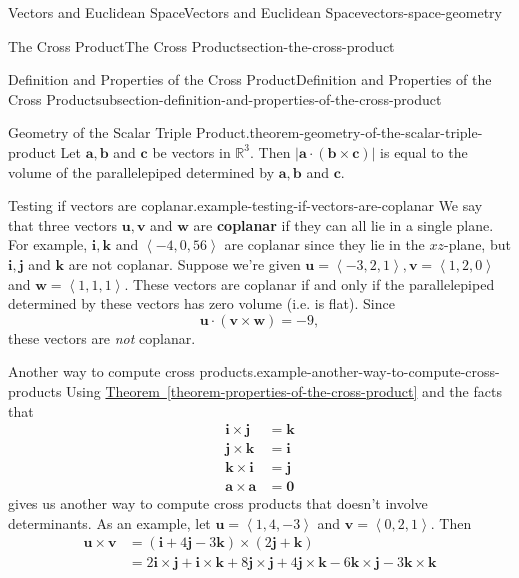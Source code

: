 \documentclass[oneside,10pt,]{book}
\newcommand{\terminology}[1]{\textbf{#1}}
\numberwithin{equation}{section}
\newcommand{\RR}{\mathbb{R}}
\newcommand{\vv}[1]{\mathbf{#1}}
\newcommand{\dotprod}[1]{\left\langle #1 \right\rangle}
\begin{document}
\begin{chapterptx}{Vectors and Euclidean Space}{}{Vectors and Euclidean Space}{}{}{vectors-space-geometry}
\begin{sectionptx}{The Cross Product}{}{The Cross Product}{}{}{section-the-cross-product}
\begin{subsectionptx}{Definition and Properties of the Cross Product}{}{Definition and Properties of the Cross Product}{}{}{subsection-definition-and-properties-of-the-cross-product}
\begin{theorem}{Geometry of the Scalar Triple Product.}{}{theorem-geometry-of-the-scalar-triple-product}%
\hypertarget{p-1186}{}%
Let \(\vv{a},\vv{b}\) and \(\vv{c}\) be vectors in \(\RR^{3}\). Then \(|\vv{a}\cdot(\vv{b}\times\vv{c})|\) is equal to the volume of the parallelepiped determined by \(\vv{a},\vv{b}\) and \(\vv{c}\).%
\end{theorem}
\begin{example}{Testing if vectors are coplanar.}{example-testing-if-vectors-are-coplanar}%
\hypertarget{p-1187}{}%
We say that three vectors \(\vv{u},\vv{v}\) and \(\vv{w}\) are \terminology{coplanar} if they can all lie in a single plane. For example, \(\vv{i},\vv{k}\) and \(\dotprod{-4,0,56}\) are coplanar since they lie in the \(xz\)-plane, but \(\vv{i},\vv{j}\) and \(\vv{k}\) are not coplanar. Suppose we're given \(\vv{u} = \dotprod{-3,2,1},\vv{v} = \dotprod{1,2,0}\) and \(\vv{w} = \dotprod{1,1,1}\). These vectors are coplanar if and only if the parallelepiped determined by these vectors has zero volume (i.e. is flat). Since%
%
\begin{equation*}
\vv{u}\cdot(\vv{v}\times\vv{w}) = -9,
\end{equation*}
\hypertarget{p-1188}{}%
these vectors are \emph{not} coplanar.%
\end{example}
\begin{example}{Another way to compute cross products.}{example-another-way-to-compute-cross-products}%
\hypertarget{p-1189}{}%
Using \hyperref[theorem-properties-of-the-cross-product]{Theorem~\ref{theorem-properties-of-the-cross-product}} and the facts that%
%
\begin{align*}
\vv{i}\times\vv{j} & = \vv{k} \\
\vv{j}\times\vv{k} & = \vv{i} \\
\vv{k}\times\vv{i} & = \vv{j} \\
\vv{a}\times\vv{a} & = \vv{0} 
\end{align*}
\hypertarget{p-1190}{}%
gives us another way to compute cross products that doesn't involve determinants. As an example, let \(\vv{u} = \dotprod{1,4,-3}\) and \(\vv{v} = \dotprod{0,2,1}.\) Then%
%
\begin{align*}
\vv{u}\times\vv{v} & = (\vv{i}+4\vv{j}-3\vv{k})\times(2\vv{j}+\vv{k}) \\
& = 2\vv{i}\times\vv{j} + \vv{i}\times\vv{k} +8\vv{j}\times\vv{j} + 4\vv{j}\times\vv{k} - 6\vv{k}\times\vv{j} -3\vv{k}\times\vv{k} \\

\end{align*}
\end{example}
\end{subsectionptx}
\end{sectionptx}
\end{chapterptx}
\end{document}
